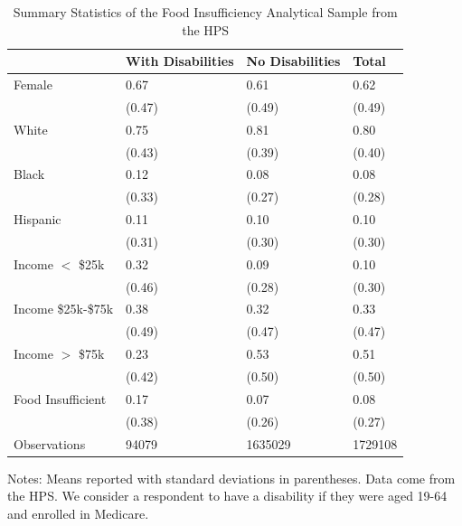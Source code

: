 \documentclass[12pt]{article}
\begin{document}
\begin{table}[!ht]
    \centering
    \caption{Summary Statistics of the Food Insufficiency Analytical Sample from the HPS}
    \begin{tabular}{llll}
    \hline \hline
        ~ & With Disabilities & No Disabilities & Total \\ \hline
        Female & 0.67  & 0.61  & 0.62  \\ 
        ~ & (0.47) & (0.49) & (0.49) \\ 
        White & 0.75  & 0.81  & 0.80  \\ 
        ~ & (0.43) & (0.39) & (0.40) \\ 
        Black & 0.12  & 0.08  & 0.08  \\ 
        ~ & (0.33) & (0.27) & (0.28) \\ 
        Hispanic & 0.11  & 0.10  & 0.10  \\ 
        ~ & (0.31) & (0.30) & (0.30) \\ 
        Income $<$ \$25k & 0.32  & 0.09  & 0.10  \\ 
        ~ & (0.46) & (0.28) & (0.30) \\ 
        Income \$25k-\$75k & 0.38  & 0.32  & 0.33  \\ 
        ~ & (0.49) & (0.47) & (0.47) \\ 
        Income $>$ \$75k & 0.23  & 0.53  & 0.51  \\ 
        ~ & (0.42) & (0.50) & (0.50) \\ 
        Food Insufficient & 0.17  & 0.07  & 0.08  \\ 
        ~ & (0.38) & (0.26) & (0.27) \\ 
        Observations & 94079 & 1635029 & 1729108 \\ 
        \hline \hline
    \end{tabular}
    \label{hps_food_sample}
    \medskip 
\begin{minipage}{0.7\textwidth} 
{\footnotesize Notes: Means reported with standard deviations in parentheses. Data come from the HPS. We consider a respondent to have a disability if they were aged 19-64 and enrolled in Medicare. \par}
\end{minipage}
\end{table}

\end{document}
